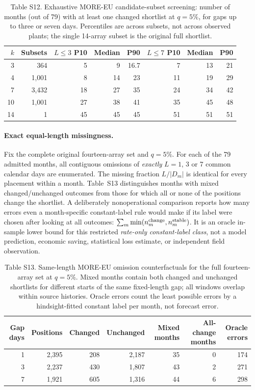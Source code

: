\documentclass[11pt]{article}
\begin{document}
\begin{table}[htbp]
\centering
\caption*{Table S12. Exhaustive MORE-EU candidate-subset screening: number of months (out of 79) with at least one changed shortlist at $q=5\%$, for gaps up to three or seven days. Percentiles are across subsets, not across observed plants; the single 14-array subset is the original full shortlist.}
\scriptsize
\setlength{\tabcolsep}{5pt}
\begin{tabular}{rrrrrrrr}
\toprule
$k$ & Subsets & $L\leq3$ P10 & Median & P90 & $L\leq7$ P10 & Median & P90 \\
\midrule
3 & 364 & 5 & 9 & 16.7 & 7 & 13 & 21 \\
4 & 1,001 & 8 & 14 & 23 & 11 & 19 & 29 \\
7 & 3,432 & 18 & 27 & 35 & 24 & 34 & 42 \\
10 & 1,001 & 27 & 38 & 41 & 35 & 45 & 48 \\
14 & 1 & 45 & 45 & 45 & 51 & 51 & 51 \\
\bottomrule
\end{tabular}
\end{table}

\paragraph{Exact equal-length missingness.} Fix the complete original fourteen-array set and $q=5\%$. For each of the 79 admitted months, all contiguous omissions of \emph{exactly} $L=1$, 3 or 7 common calendar days are enumerated. The missing fraction $L/\lvert D_m\rvert$ is identical for every placement within a month. Table~S13 distinguishes months with mixed changed/unchanged outcomes from those for which all or none of the positions change the shortlist. A deliberately nonoperational comparison reports how many errors even a month-specific constant-label rule would make if its label were chosen after looking at all outcomes: $\sum_m\min(n_m^{\rm change},n_m^{\rm stable})$. It is an oracle in-sample lower bound for this restricted \emph{rate-only constant-label class}, not a model prediction, economic saving, statistical loss estimate, or independent field observation.

\begin{table}[htbp]
\centering
\caption*{Table S13. Same-length MORE-EU omission counterfactuals for the full fourteen-array set at $q=5\%$. Mixed months contain both changed and unchanged shortlists for different starts of the same fixed-length gap; all windows overlap within source histories. Oracle errors count the least possible errors by a hindsight-fitted constant label per month, not forecast error.}
\scriptsize
\setlength{\tabcolsep}{5pt}
\begin{tabular}{rrrrrrr}
\toprule
Gap days & Positions & Changed & Unchanged & Mixed months & All-change months & Oracle errors \\
\midrule
1 & 2,395 & 208 & 2,187 & 35 & 0 & 174 \\
3 & 2,237 & 430 & 1,807 & 43 & 2 & 271 \\
7 & 1,921 & 605 & 1,316 & 44 & 6 & 298 \\
\bottomrule
\end{tabular}
\end{table}
\end{document}
